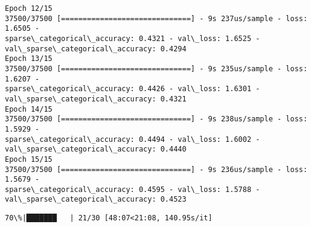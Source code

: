\documentclass[11pt]{article}
\begin{document}
\begin{Verbatim}[commandchars=\\\{\}]
Epoch 12/15
37500/37500 [==============================] - 9s 237us/sample - loss: 1.6505 -
sparse\_categorical\_accuracy: 0.4321 - val\_loss: 1.6525 -
val\_sparse\_categorical\_accuracy: 0.4294
Epoch 13/15
37500/37500 [==============================] - 9s 235us/sample - loss: 1.6207 -
sparse\_categorical\_accuracy: 0.4426 - val\_loss: 1.6301 -
val\_sparse\_categorical\_accuracy: 0.4321
Epoch 14/15
37500/37500 [==============================] - 9s 238us/sample - loss: 1.5929 -
sparse\_categorical\_accuracy: 0.4494 - val\_loss: 1.6002 -
val\_sparse\_categorical\_accuracy: 0.4440
Epoch 15/15
37500/37500 [==============================] - 9s 236us/sample - loss: 1.5679 -
sparse\_categorical\_accuracy: 0.4595 - val\_loss: 1.5788 -
val\_sparse\_categorical\_accuracy: 0.4523
    \end{Verbatim}

    \begin{Verbatim}[commandchars=\\\{\}]
 70\%|███████   | 21/30 [48:07<21:08, 140.95s/it]
    \end{Verbatim}
\end{document}
